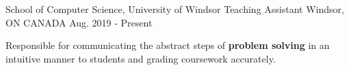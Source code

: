 

\begin{cventries}


  \cventry
    {School of Computer Science, University of Windsor} %
    {Teaching Assistant} %
    {Windsor, ON CANADA} %
    {Aug. 2019 - Present} %
    {
      \begin{cvitems} %
        \item {Responsible for communicating the abstract steps of \textbf{problem solving} in an intuitive manner to students and grading coursework accurately.}
      \end{cvitems}
    }

\end{cventries}
